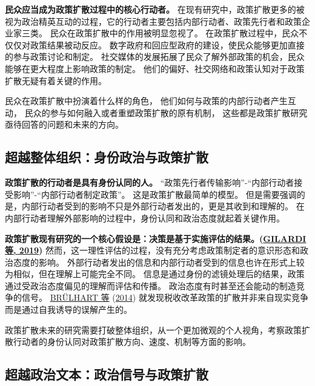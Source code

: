 \documentclass[
  12pt,
]{ctexart}
\begin{document}
\textbf{民众应当成为政策扩散过程中的核心行动者。}
在现有研究中，政策扩散更多的被视为政治精英互动的过程，它的行动者主要包括内部行动者、政策先行者和政策企业家三类。
民众在政策扩散中的作用被明显忽视了。
在政策扩散过程中，民众不仅仅对政策结果被动反应。
数字政府和回应型政府的建设，使民众能够更加直接的参与政策讨论和制定。
社交媒体的发展拓展了民众了解外部政策的机会，民众能够在更大程度上影响政策的制定。
他们的偏好、社交网络和政策认知对于政策扩散无疑有着关键的作用。

民众在政策扩散中扮演着什么样的角色，
他们如何与政策的内部行动者产生互动，
民众的参与如何融入或者重塑政策扩散的原有机制，
这些都是政策扩散研究亟待回答的问题和未来的方向。

\hypertarget{ux8d85ux8d8aux6574ux4f53ux7ec4ux7ec7ux8eabux4efdux653fux6cbbux4e0eux653fux7b56ux6269ux6563}{%
\subsection{超越整体组织：身份政治与政策扩散}\label{ux8d85ux8d8aux6574ux4f53ux7ec4ux7ec7ux8eabux4efdux653fux6cbbux4e0eux653fux7b56ux6269ux6563}}

\textbf{政策扩散的行动者是具有身份认同的人。}
``政策先行者传输影响''-``内部行动者接受影响''-``内部行动者制定政策''。
这是政策扩散最简单的模型。
但是需要强调的是，内部行动者受到的影响不只是外部行动者发出的，更是其收到和理解的。
在内部行动者理解外部影响的过程中，身份认同和政治态度就起着关键作用。

\textbf{政策扩散现有研究的一个核心假设是：决策是基于实施评估的结果。(\protect\hyperlink{ref-GilardiWasserfallen2019}{GILARDI 等, 2019})}
然而，这一理性评估的过程，没有充分考虑政策制定者的意识形态和政治态度的影响。
外部行动者发出的信息和内部行动者受到的信息也许在形式上较为相似，但在理解上可能完全不同。
信息是通过身份的滤镜处理后的结果，政策通过受政治态度偏见的理解而评估和传播。
政治态度有时甚至还会能动的制造竞争的信号。 \protect\hyperlink{ref-BrulhartParchet2014}{BRÜLHART 等} (\protect\hyperlink{ref-BrulhartParchet2014}{2014}) 就发现税收改革政策的扩散并非来自现实竞争而是通过自我诱导的误解产生的。

政策扩散未来的研究需要打破整体组织，从一个更加微观的个人视角，考察政策扩散行动者的身份认同对政策扩散方向、速度、机制等方面的影响。

\hypertarget{ux8d85ux8d8aux653fux6cbbux6587ux672cux653fux6cbbux4fe1ux53f7ux4e0eux653fux7b56ux6269ux6563}{%
\subsection{超越政治文本：政治信号与政策扩散}\label{ux8d85ux8d8aux653fux6cbbux6587ux672cux653fux6cbbux4fe1ux53f7ux4e0eux653fux7b56ux6269ux6563}}
\end{document}
